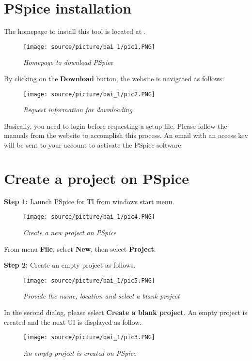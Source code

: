 \section{PSpice installation}
The homepage to install this tool is located at . 
\begin{figure}[!htp]
    \centering
    \texttt{[image: source/picture/bai\_1/pic1.PNG]}
    \caption{\textit{Homepage to download PSpice}}
    \label{bai1_pic1}
\end{figure}

By clicking on the \textbf{Download} button, the website is navigated as follows:
\begin{figure}[!htp]
    \centering
    \texttt{[image: source/picture/bai\_1/pic2.PNG]}
    \caption{\textit{Request information for downloading}}
    \label{bai1_pic2}
\end{figure}

Basically, you need to login before requesting a setup file. Please follow the manuals from the website to accomplish this process. An email with an access key will be sent to your account to activate the PSpice software.

\section{Create a project on PSpice}
\textbf{Step 1: } Launch PSpice for TI from windows start menu.
\begin{figure}[!htp]
    \centering
    \texttt{[image: source/picture/bai\_1/pic4.PNG]}
    \caption{\textit{Create a new project on PSpice}}
    \label{bai1_pic3}
\end{figure}

From menu \textbf{File}, select \textbf{New}, then select \textbf{Project}.

\textbf{Step 2: } Create an empty project as follows.
\newpage
\begin{figure}[!htp]
    \centering
    \texttt{[image: source/picture/bai\_1/pic5.PNG]}
    \caption{\textit{Provide the name, location and select a blank project}}
    \label{bai1_pic5}
\end{figure}

In the second dialog, please select \textbf{Create a blank project}. An empty project is created and the next UI is displayed as follow.
\begin{figure}[!htp]
    \centering
    \texttt{[image: source/picture/bai\_1/pic3.PNG]}
    \caption{\textit{An empty project is created on PSpice}}
    \label{bai1_pic3}
\end{figure}


